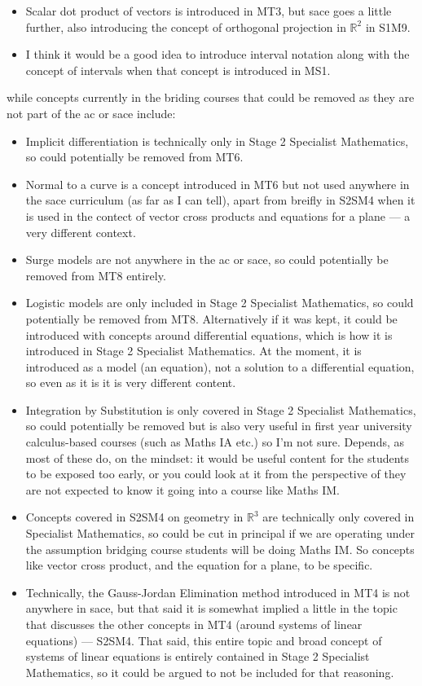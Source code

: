 \documentclass[twoside,12pt,a4paper]{report}
\begin{document}
\begin{itemize}
	\item Scalar dot product of vectors is introduced in MT3, but \gls{sace} goes a little further, also introducing the concept of orthogonal projection in $\mathbb{R}^2$ in S1M9.
	\item I think it would be a good idea to introduce interval notation along with the concept of intervals when that concept is introduced in MS1.
\end{itemize}


while concepts currently in the briding courses that could be removed as they are not part of the \gls{ac} or \gls{sace} include:
\begin{itemize}
	\item Implicit differentiation is technically only in Stage 2 Specialist Mathematics, so could potentially be removed from MT6.
	\item Normal to a curve is a concept introduced in MT6 but not used anywhere in the \gls{sace} curriculum (as far as I can tell), apart from breifly in S2SM4 when it is used in the contect of vector cross products and equations for a plane --- a very different context.
	\item Surge models are not anywhere in the \gls{ac} or \gls{sace}, so could potentially be removed from MT8 entirely.	
	\item Logistic models are only included in Stage 2 Specialist Mathematics, so could potentially be removed from MT8. Alternatively if it was kept, it could be introduced with concepts around differential equations, which is how it is introduced in Stage 2 Specialist Mathematics. At the moment, it is introduced as a model (an equation), not a solution to a differential equation, so even as it is it is very different content.
	\item Integration by Substitution is only covered in Stage 2 Specialist Mathematics, so could potentially be removed but is also very useful in first year university calculus-based courses (such as Maths IA etc.) so I'm not sure. Depends, as most of these do, on the mindset: it would be useful content for the students to be exposed too early, or you could look at it from the perspective of they are not expected to know it going into a course like Maths IM. 
	\item Concepts covered in S2SM4 on geometry in $\mathbb{R}^3$ are technically only covered in Specialist Mathematics, so could be cut in principal if we are operating under the assumption bridging course students will be doing Maths IM. So concepts like vector cross product, and the equation for a plane, to be specific.
	\item Technically, the Gauss-Jordan Elimination method introduced in MT4 is not anywhere in \gls{sace}, but that said it is somewhat implied a little in the topic that discusses the other concepts in MT4 (around systems of linear equations) --- S2SM4. That said, this entire topic and broad concept of systems of linear equations is entirely contained in Stage 2 Specialist Mathematics, so it could be argued to not be included for that reasoning.
\end{itemize}
\end{document}
